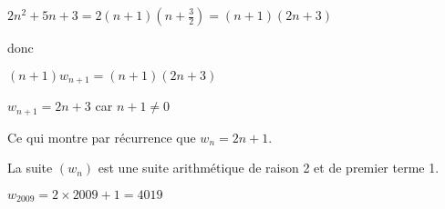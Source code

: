 \begin{corrige}
\begin{enumerate}
\begin{enumerate}[label=\alph*.]
               \par
               $2n^{2}+5n+3=2\left(n+1\right)\left(n+\frac{3}{2}\right)=\left(n+1\right)\left(2n+3\right)$
               \par
               donc
               \par
               $\left(n+1\right)w_{n+1}=\left(n+1\right)\left(2n+3\right)$
               \par
               $w_{n+1}=2n+3$ car $n+1\neq 0$
               \par
               Ce qui montre par récurrence que $w_{n}=2n+1$.
               \par
               La suite $\left(w_{n}\right)$ est une suite arithmétique de raison 2 et de premier terme 1.
               \par
               $w_{2009}=2\times 2009+1=4019$
          \end{enumerate}
     \end{enumerate}
\end{corrige}
